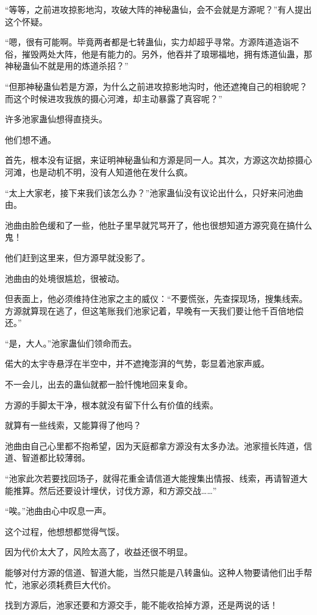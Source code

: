 \begin{this_body}
“等等，之前进攻掠影地沟，攻破大阵的神秘蛊仙，会不会就是方源呢？”有人提出这个怀疑。

“嗯，很有可能啊。毕竟两者都是七转蛊仙，实力却超乎寻常。方源阵道造诣不俗，摧毁两处大阵，他是有能力的。另外，他吞并了琅琊福地，拥有炼道仙蛊，那神秘蛊仙不就是用的炼道杀招？”

“但那神秘蛊仙若是方源，为什么之前进攻掠影地沟时，他还遮掩自己的相貌呢？而这个时候进攻我族的摄心河滩，却主动暴露了真容呢？”

许多池家蛊仙想得直挠头。

他们想不通。

首先，根本没有证据，来证明神秘蛊仙和方源是同一人。其次，方源这次劫掠摄心河滩，也是动机不明，没有人知道他在发什么疯。

“太上大家老，接下来我们该怎么办？”池家蛊仙没有议论出什么，只好来问池曲由。

池曲由脸色缓和了一些，他肚子里早就咒骂开了，他也很想知道方源究竟在搞什么鬼！

他们赶到这里来，但方源早就没影了。

池曲由的处境很尴尬，很被动。

但表面上，他必须维持住池家之主的威仪：“不要慌张，先查探现场，搜集线索。方源就算现在逃了，但这笔账我们池家记着，早晚有一天我们要让他千百倍地偿还。”

“是，大人。”池家蛊仙们领命而去。

偌大的太宇寺悬浮在半空中，并不遮掩澎湃的气势，彰显着池家声威。

不一会儿，出去的蛊仙就都一脸忏愧地回来复命。

方源的手脚太干净，根本就没有留下什么有价值的线索。

就算有一些线索，又能算得了他吗？

池曲由自己心里都不抱希望，因为天庭都拿方源没有太多办法。池家擅长阵道，信道、智道都比较薄弱。

“池家此次若要找回场子，就得花重金请信道大能搜集出情报、线索，再请智道大能推算。然后还要设计埋伏，讨伐方源，和方源交战……”

“唉。”池曲由心中叹息一声。

这个过程，他想想都觉得气馁。

因为代价太大了，风险太高了，收益还很不明显。

能够对付方源的信道、智道大能，当然只能是八转蛊仙。这种人物要请他们出手帮忙，池家必须耗费巨大代价。

找到方源后，池家还要和方源交手，能不能收拾掉方源，还是两说的话！


\end{this_body}
